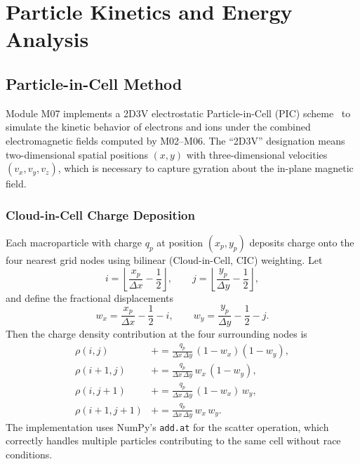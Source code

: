 \documentclass[11pt,a4paper]{report}
\newcommand{\dx}{\Delta x}
\newcommand{\dy}{\Delta y}
\begin{document}
\chapter{Particle Kinetics and Energy Analysis}
\label{ch:kinetics}

\section{Particle-in-Cell Method}
\label{sec:m07}

Module M07 implements a 2D3V electrostatic Particle-in-Cell (PIC) scheme~\cite{Birdsall2004,Hockney1988} to simulate the kinetic behavior of electrons and ions under the combined electromagnetic fields computed by M02--M06.  The ``2D3V'' designation means two-dimensional spatial positions $(x, y)$ with three-dimensional velocities $(v_x, v_y, v_z)$, which is necessary to capture gyration about the in-plane magnetic field.

\subsection{Cloud-in-Cell Charge Deposition}

Each macroparticle with charge $q_p$ at position $(x_p, y_p)$ deposits charge onto the four nearest grid nodes using bilinear (Cloud-in-Cell, CIC) weighting.  Let
\begin{equation}
  i = \left\lfloor \frac{x_p}{\dx} - \frac{1}{2} \right\rfloor, \qquad
  j = \left\lfloor \frac{y_p}{\dy} - \frac{1}{2} \right\rfloor,
  \label{eq:pic-cell-index}
\end{equation}
and define the fractional displacements
\begin{equation}
  w_x = \frac{x_p}{\dx} - \frac{1}{2} - i, \qquad
  w_y = \frac{y_p}{\dy} - \frac{1}{2} - j.
  \label{eq:pic-weights}
\end{equation}
Then the charge density contribution at the four surrounding nodes is
\begin{align}
  \rho(i,j)         &\mathrel{+}= \frac{q_p}{\dx\,\dy}\,(1 - w_x)(1 - w_y),
  \label{eq:cic-deposit-00}\\
  \rho(i{+}1,j)     &\mathrel{+}= \frac{q_p}{\dx\,\dy}\,w_x\,(1 - w_y),
  \label{eq:cic-deposit-10}\\
  \rho(i,j{+}1)     &\mathrel{+}= \frac{q_p}{\dx\,\dy}\,(1 - w_x)\,w_y,
  \label{eq:cic-deposit-01}\\
  \rho(i{+}1,j{+}1) &\mathrel{+}= \frac{q_p}{\dx\,\dy}\,w_x\,w_y.
  \label{eq:cic-deposit-11}
\end{align}
The implementation uses NumPy's \texttt{add.at} for the scatter operation, which correctly handles multiple particles contributing to the same cell without race conditions.
\end{document}
